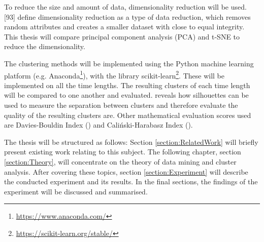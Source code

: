 To reduce the size and amount of data, dimensionality reduction will be used. \textcite{han2011data}[93] define dimensionality reduction as a type of data reduction, which removes random attributes and creates a smaller dataset with close to equal integrity. This thesis will compare principal component analysis (PCA) and t-SNE to reduce the dimensionality.

The clustering methods will be implemented using the Python machine learning platform (e.g. Anaconda\footnote{\url{https://www.anaconda.com/}}), with the library scikit-learn\footnote{\url{https://scikit-learn.org/stable/}}. These will be implemented on all the time lengths. The resulting clusters of each time length will be compared to one another and evaluated. 
\textcite{rousseeuw1987silhouettes} reveals how silhouettes can be used to measure the separation between clusters and therefore evaluate the quality of the resulting clusters are. Other mathematical evaluation scores used are Davies-Bouldin Index (\textcite{DaviesBouldin}) and Caliński-Harabasz Index (\textcite{calinskiHarabasz}).




The thesis will be structured as follows: Section \ref{section:RelatedWork} will briefly present existing work relating to this subject. The following chapter, section \ref{section:Theory}, will concentrate on the theory of data mining and cluster analysis. After covering these topics, section \ref{section:Experiment} will describe the conducted experiment and its results. In the final sections, the findings of the experiment will be discussed and summarised. 




